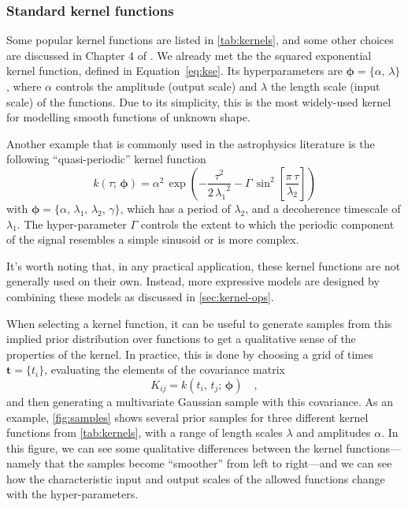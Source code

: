 \documentclass[letterpaper]{ar-1col}
\newcommand{\hyperparams}{\ensuremath{\boldsymbol{\phi}}}
\newcommand{\dt}{\ensuremath{\tau}}
\newcommand{\amplitude}{\ensuremath{\alpha}}
\newcommand{\lengthscale}{\ensuremath{\lambda}}
\begin{document}
\subsubsection{Standard kernel functions}\label{sec:standard-kernels}

Some popular kernel functions are listed in \autoref{tab:kernels}, and some other choices are discussed in Chapter 4 of \citet{gpml}. We already met the 
the squared exponential kernel function, defined in Equation~\ref{eq:kse}. Its  hyperparameters are $\hyperparams = \{\amplitude,\,\lengthscale\}$, where $\amplitude$ controls the amplitude (output scale) and $\lengthscale$ the length scale (input scale) of the functions. Due to its simplicity, this is the most widely-used kernel for modelling smooth functions of unknown shape.

Another example that is commonly used in the astrophysics literature \citep{2012MNRAS.419.3147A,2014MNRAS.443.2517H} is the following ``quasi-periodic'' kernel function
\begin{equation}
\label{eq:kqp}
  k(\dt;\,\hyperparams) = \amplitude^2\,\exp\left(-\frac{\dt^2}{2\,{\lengthscale_1}^2} -\Gamma\,\sin^2\left[\frac{\pi\,\dt}{\lengthscale_2}\right] \right)
\end{equation}
with $\hyperparams = \{\amplitude,\,\lengthscale_1,\,\lengthscale_2,\,\gamma\}$, which has a period of $\lengthscale_2$, and a decoherence timescale of $\lengthscale_1$. The hyper-parameter $\Gamma$ controls the extent to which the periodic component of the signal resembles a simple sinusoid or is more complex.

It's worth noting that, in any practical application, these kernel functions are not generally used on their own.
Instead, more expressive models are designed by combining these models as discussed in \autoref{sec:kernel-ops}.

When selecting a kernel function, it can be useful to generate samples from this implied prior distribution over functions to get a qualitative sense of the properties of the kernel.
In practice, this is done by choosing a grid of times $\boldsymbol{t} = \{t_i\}$, evaluating the elements of the covariance matrix
\begin{equation}
  K_{ij} = k(t_i,\,t_j;\,\hyperparams) \quad,
\end{equation}
and then generating a multivariate Gaussian sample with this covariance.
As an example, \autoref{fig:samples} shows several prior samples for three different kernel functions from \autoref{tab:kernels}, with a range of length scales $\lengthscale$ and amplitudes $\amplitude$.
In this figure, we can see some qualitative differences between the kernel functions---namely that the samples become ``smoother'' from left to right---and we can see how the characteristic input and output scales of the allowed functions change with the hyper-parameters.
\end{document}
